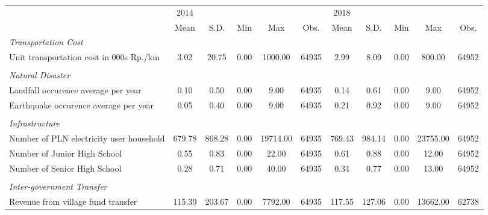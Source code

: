 \begin{tabular}{l*{2}{ccccc}}
\toprule
                &     2014&         &         &         &         &     2018&         &         &         &         \\
                &     Mean&     S.D.&      Min&      Max&     Obs.&     Mean&     S.D.&      Min&      Max&     Obs.\\
\midrule
\emph{Transportation Cost}&         &         &         &         &         &         &         &         &         &         \\
\hspace{0.25cm} Unit transportation cost in 000s Rp./km&     3.02&    20.75&     0.00&  1000.00&    64935&     2.99&     8.09&     0.00&   800.00&    64952\\
\vspace{0.05em} \\ \emph{Natural Disaster}&         &         &         &         &         &         &         &         &         &         \\
\hspace{0.25cm} Landfall occurence average per year&     0.10&     0.50&     0.00&     9.00&    64935&     0.14&     0.61&     0.00&     9.00&    64952\\
\hspace{0.25cm} Earthquake occurence average per year&     0.05&     0.40&     0.00&     9.00&    64935&     0.21&     0.92&     0.00&     9.00&    64952\\
\vspace{0.05em} \\ \emph{Infrastructure}&         &         &         &         &         &         &         &         &         &         \\
\hspace{0.25cm} Number of PLN electricity user household&   679.78&   868.28&     0.00& 19714.00&    64935&   769.43&   984.14&     0.00& 23755.00&    64952\\
\hspace{0.25cm} Number of Junior High School&     0.55&     0.83&     0.00&    22.00&    64935&     0.61&     0.88&     0.00&    12.00&    64952\\
\hspace{0.25cm} Number of Senior High School&     0.28&     0.71&     0.00&    40.00&    64935&     0.34&     0.77&     0.00&    13.00&    64952\\
\vspace{0.05em} \\ \emph{Inter-government Transfer}&         &         &         &         &         &         &         &         &         &         \\
\hspace{0.25cm} Revenue from village fund transfer&   115.39&   203.67&     0.00&  7792.00&    64935&   117.55&   127.06&     0.00& 13662.00&    62738\\
\bottomrule
\end{tabular}
